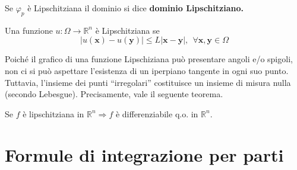 \documentclass[10pt,a4paper,twoside,openright]{book}
\newcommand{\x}{\mathbf{x}}
\newcommand{\y}{\mathbf{y}}
\begin{document}
Se $\varphi _{p}$ è Lipschitziana il dominio si dice \textbf{dominio Lipschitziano.}
\begin{definition}
     Una funzione $u:\Omega \rightarrow \mathbb{R}^{n}$ è Lipschitziana se
    \begin{equation*}
        | u(\x) -u(\y)| \leqslant L|\x-\y|,\ \ \forall \x,\y\in \Omega
    \end{equation*}
\end{definition}
Poiché il grafico di una funzione Lipschiziana può presentare angoli e/o spigoli, non ci si può aspettare l’esistenza di un iperpiano tangente in ogni suo punto. Tuttavia, l’insieme dei punti ``irregolari'' costituisce un insieme di misura nulla (secondo Lebesgue). Precisamente, vale il seguente teorema.
\begin{theorem}
    [di Rademacher] Se $f$ è lipschitziana in $\mathbb{R}^{n} \Rightarrow f$ è differenziabile q.o. in $\mathbb{R}^{n}$.
\end{theorem}
\section{Formule di integrazione per parti}
\end{document}
